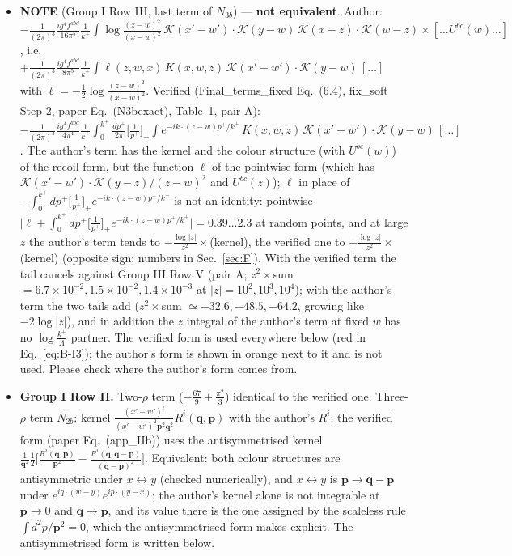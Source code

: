 \documentclass[9pt]{article}
\numberwithin{equation}{section}
\begin{document}
\begin{itemize}
\item[A2] {\color{red}\textbf{NOTE} (Group I Row III, last term of $N_{3b}$) --- \textbf{not equivalent}. Author: $-\frac{1}{(2\pi)^{3}}\frac{ig^{4}f^{abd}}{16\pi^{5}}\frac{1}{k^{+}}\int\log\frac{(z-w)^{2}}{(x-w)^{2}}\,\mathcal{K}(x'-w')\cdot\mathcal{K}(y-w)\,\mathcal{K}(x-z)\cdot\mathcal{K}(w-z)\times[\dots U^{bc}(w)\dots]$, i.e.\ $+\frac{1}{(2\pi)^{3}}\frac{ig^{4}f^{abd}}{8\pi^{5}}\frac{1}{k^{+}}\int\ell(z,w,x)\,K(x,w,z)\,\mathcal{K}(x'-w')\cdot\mathcal{K}(y-w)\,[\dots]$ with $\ell=-\frac12\log\frac{(z-w)^{2}}{(x-w)^{2}}$. Verified (Final\_terms\_fixed Eq.~(6.4), fix\_soft Step 2, paper Eq.~(N3bexact), Table~1, pair A): $-\frac{1}{(2\pi)^{3}}\frac{ig^{4}f^{abd}}{4\pi^{4}}\frac{1}{k^{+}}\int_{0}^{k^{+}}\frac{dp^{+}}{2\pi}\big[\frac{1}{p^{+}}\big]_{+}\int e^{-ik\cdot(z-w)p^{+}/k^{+}}\,K(x,w,z)\,\mathcal{K}(x'-w')\cdot\mathcal{K}(y-w)\,[\dots]$. The author's term has the kernel and the colour structure (with $U^{bc}(w)$) of the recoil form, but the function $\ell$ of the pointwise form (which has $\mathcal{K}(x'-w')\cdot\mathcal{K}(y-z)/(z-w)^{2}$ and $U^{bc}(z)$); $\ell$ in place of $-\int_{0}^{k^{+}}dp^{+}\big[\frac{1}{p^{+}}\big]_{+}e^{-ik\cdot(z-w)p^{+}/k^{+}}$ is not an identity: pointwise $\big|\ell+\int_{0}^{k^{+}}dp^{+}\big[\frac{1}{p^{+}}\big]_{+}e^{-ik\cdot(z-w)p^{+}/k^{+}}\big|=0.39\dots2.3$ at random points, and at large $z$ the author's term tends to $-\frac{\log|z|}{z^{2}}\times$(kernel), the verified one to $+\frac{\log|z|}{z^{2}}\times$(kernel) (opposite sign; numbers in Sec.~\ref{sec:F}). With the verified term the tail cancels against Group III Row V (pair A; $z^{2}\times$sum $=6.7\times10^{-2},1.5\times10^{-2},1.4\times10^{-3}$ at $|z|=10^{2},10^{3},10^{4}$); with the author's term the two tails add ($z^{2}\times$sum $\simeq-32.6,-48.5,-64.2$, growing like $-2\log|z|$), and in addition the $z$ integral of the author's term at fixed $w$ has no $\log\frac{k^{+}}{\Lambda}$ partner. The verified form is used everywhere below (red in Eq.~\eqref{eq:B-I3}); the author's form is shown in orange next to it and is not used. Please check where the author's form comes from.}
\item[A3] \textbf{Group I Row II.} Two-$\rho$ term ($-\frac{67}{9}+\frac{\pi^{2}}{3}$) identical to the verified one. Three-$\rho$ term $N_{2b}$: kernel $\frac{(x'-w')^{i}}{(x'-w')^{2}\mathbf{p}^{2}\mathbf{q}^{2}}R^{i}(\mathbf{q},\mathbf{p})$ with the author's $R^{i}$; the verified form (paper Eq.~(app\_IIb)) uses the antisymmetrised kernel $\frac{1}{\mathbf{q}^{2}}\frac12\big[\frac{R^{i}(\mathbf{q},\mathbf{p})}{\mathbf{p}^{2}}-\frac{R^{i}(\mathbf{q},\mathbf{q}-\mathbf{p})}{(\mathbf{q}-\mathbf{p})^{2}}\big]$. Equivalent: both colour structures are antisymmetric under $x\leftrightarrow y$ (checked numerically), and $x\leftrightarrow y$ is $\mathbf{p}\to\mathbf{q}-\mathbf{p}$ under $e^{iq\cdot(w-y)}e^{ip\cdot(y-x)}$; the author's kernel alone is not integrable at $\mathbf{p}\to0$ and $\mathbf{q}\to\mathbf{p}$, and its value there is the one assigned by the scaleless rule $\int d^{2}p/\mathbf{p}^{2}=0$, which the antisymmetrised form makes explicit. The antisymmetrised form is written below.

\end{itemize}
\end{document}

